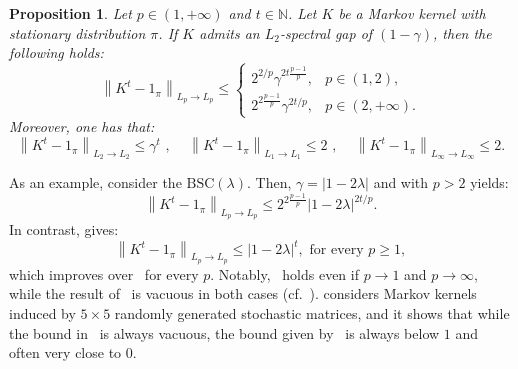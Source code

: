 \documentclass[11pt]{article}
\theoremstyle{plain}
\newtheorem{proposition}{Proposition}
\theoremstyle{remark}
\begin{document}
\begin{proposition}\label{prop:L2toLalphaConvergence}
        Let $p \in (1,+\infty)$ and $t\in\mathbb{N}$. Let $K$ be a Markov kernel with stationary distribution $\pi$. If $K$ admits an $L_2$-spectral gap of $(1-\gamma)$, then the following holds:
    \begin{equation}\label{eq:contractionMarkovChainLalpha}
            \left\lVert K^t-1_\pi \right\rVert_{L_p\to L_p} \leq \begin{cases}
                2^{2/p} \gamma^{2t \frac{p-1}{p}}, & p \in (1,2), \\
                2^{2 \frac{p-1}{p}} \gamma ^{2t/p}, &p \in (2,+\infty).
            \end{cases}
        \end{equation}
        Moreover, one has that:
    \begin{equation}
             \left\lVert K^t-1_\pi \right\rVert_{L_2\to L_2} \leq \gamma^t \text{ , }  \quad \left\lVert K^t-1_\pi \right\rVert_{L_1\to L_1} \leq 2 \text{ , }\quad  \left\lVert K^t-1_\pi \right\rVert_{L_\infty\to L_\infty} \leq 2. \label{eq:rieszThorin2-1-infty}
        \end{equation}
    \end{proposition}
As an example,  consider the $\text{BSC}(\lambda)$. Then, %
  $\gamma = |1-2\lambda|$ and  with $p> 2$ 
yields:
   \begin{equation}
        \left\lVert K^t-1_\pi \right\rVert_{L_p\to L_p} \leq 2^{2 \frac{p-1}{p}} |1-2\lambda| ^{2t/p}.\label{eq:rieszThorinDSBS}
    \end{equation}
    In contrast,  gives:
 \begin{equation}
         \left\lVert K^t-1_\pi \right\rVert_{L_p\to L_p} \leq |1-2\lambda|^{t}, \text{ for every } p\geq 1, \label{eq:contractionDSBS}
    \end{equation}
    which improves over~ for every $p$. Notably,~ holds even if $p\to 1$ and $p\to\infty$, while the result of~ is vacuous in both cases (cf.~).
 considers Markov kernels induced by $5\times 5$ randomly generated stochastic matrices, and it shows that while the bound in~ is always vacuous, the bound given by~ is always below $1$ and often very close to $0$.
\end{document}
